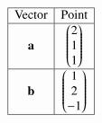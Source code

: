 \[
\begin{array}{|c|c|}
\hline
\text{Vector} & \text{Point} \\
\hline
\mathbf{a} & \begin{pmatrix}2\\1\\1\end{pmatrix} \\
\hline
\mathbf{b} & \begin{pmatrix}1\\2\\-1\end{pmatrix} \\
\hline
\end{array}
\]